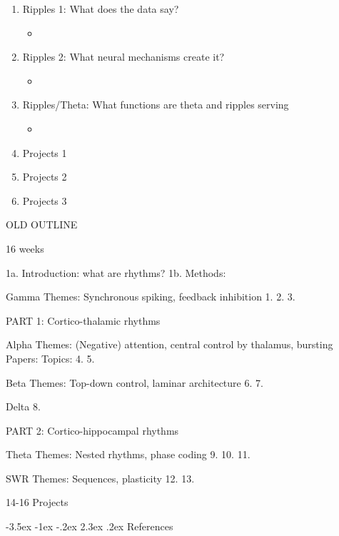 \documentclass[11pt, reqno]{amsart}
\makeatletter
\numberwithin{figure}{section}
\renewcommand\section{\@startsection {section}{1}{\z@}%
                                   {-3.5ex \@plus -1ex \@minus -.2ex}%
                                   {2.3ex \@plus.2ex}%
                                   {\normalfont\Large\bfseries\scshape}}
\numberwithin{equation}{section}
\makeatother
\begin{document}
\begin{enumerate}
\item Ripples 1: What does the data say?
\begin{itemize}
\item 
\end{itemize}
\item Ripples 2: What neural mechanisms create it?
\begin{itemize}
\item 
\end{itemize}

\item Ripples/Theta: What functions are theta and ripples serving
\begin{itemize}
\item 
\end{itemize}
\item Projects 1
\item Projects 2
\item Projects 3
\end{enumerate}


OLD OUTLINE


16 weeks

1a. Introduction: what are rhythms?
1b. Methods:

Gamma
Themes: Synchronous spiking, feedback inhibition
1.  
2.
3.

PART 1: Cortico-thalamic rhythms

Alpha
Themes: (Negative) attention, central control by thalamus, bursting
Papers:
Topics:
4. 
5.

Beta
Themes: Top-down control, laminar architecture
6.
7.

Delta
8.

PART 2: Cortico-hippocampal rhythms

Theta
Themes: Nested rhythms, phase coding
9.
10.
11.

SWR
Themes: Sequences, plasticity
12.
13.


14-16 Projects


\section{References}
\end{document}
